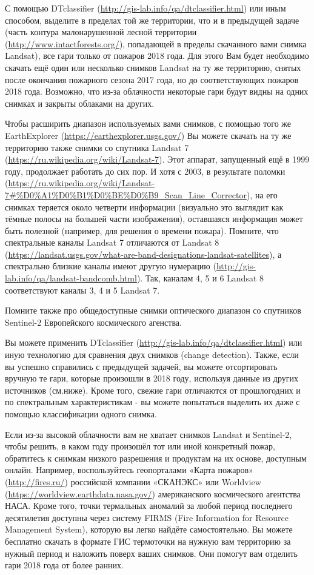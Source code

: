 
С помощью DTclassifier (\url{http://gis-lab.info/qa/dtclassifier.html}) или иным способом, выделите в пределах 
той же территории, что и в предыдущей задаче (часть контура малонарушенной лесной территории (\url{http://www.intactforests.org/}), 
попадающей в пределы скачанного вами снимка Landsat), все гари только от пожаров 2018 года. Для этого Вам будет необходимо скачать ещё один или несколько снимков Landsat на ту же территорию, снятых после окончания пожарного сезона 2017 года, но до соответствующих пожаров 2018 года. Возможно, что из-за облачности некоторые гари будут видны на одних снимках и закрыты облаками на других.

Чтобы расширить диапазон используемых вами снимков, с помощью того же EarthExplorer (\url{https://earthexplorer.usgs.gov/}) 
Вы можете скачать на ту же территорию также снимки со спутника Landsat 7 (\url{https://ru.wikipedia.org/wiki/Landsat-7}). 
Этот аппарат, запущенный ещё в 1999 году, продолжает работать до сих пор. И хотя с 2003, в результате поломки (\url{https://ru.wikipedia.org/wiki/Landsat-7#%D0%A1%D0%B1%D0%BE%D0%B9_Scan_Line_Corrector}), 
на его снимках теряется около четверти информации (визуально это выглядит как тёмные полосы на 
большей части изображения), оставшаяся информация может быть полезной (например, для решения о времени пожара). 
Помните, что спектральные каналы Landsat 7 отличаются от Landsat 8 (\url{https://landsat.usgs.gov/what-are-band-designations-landsat-satellites}), 
а спектрально близкие каналы имеют другую нумерацию (\url{http://gis-lab.info/qa/landsat-bandcomb.html}). Так, каналам 4, 5 и 6 Landsat 8 соответствуют каналы 3, 4 и 5 Landsat 7.

Помните также про общедоступные снимки оптического диапазон со спутников Sentinel-2 Европейского космического агенства. 

Вы можете применить DTclassifier (\url{http://gis-lab.info/qa/dtclassifier.html}) или иную технологию для 
сравнения двух снимков (change detection). Также, если вы успешно справились с предыдущей задачей, вы можете отсортировать вручную те гари, которые произошли в 2018 году, используя данные из других источников (см.ниже). Кроме того, свежие гари отличаются от прошлогодних и по спектральным характеристикам - вы можете попытаться выделить их даже с помощью классификации одного снимка.

Если из-за высокой облачности вам не хватает снимков Landsat и Sentinel-2, 
чтобы решить, в каком году произошёл тот или иной конкретный пожар, обратитесь к 
снимкам низкого разрешения и продуктам на их основе, доступным онлайн. Например, 
воспользуйтесь геопорталами «Карта пожаров» (\url{http://fires.ru/}) российской компании «СКАНЭКС» или Worldview (\url{https://worldview.earthdata.nasa.gov/}) американского космического агентства НАСА. Кроме того, точки термальных аномалий за любой период последнего десятилетия доступны через систему FIRMS (Fire Information for Resource Management System), которую вы легко найдёте самостоятельно. Вы можете бесплатно скачать в формате ГИС термоточки на нужную вам территорию за нужный период и наложить поверх ваших снимков. Они помогут вам отделить гари 2018 года от более ранних.

